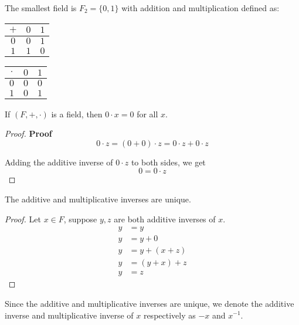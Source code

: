 \begin{remark}
The smallest field is $F_2 = \{ 0, 1 \}$ with addition and multiplication defined as: \\
\begin{center}
    \begin{tabular}{c | c | c}
        $+$ & $0$ & $1$ \\
        \hline
        $0$ & $0$ & $1$ \\
        $1$ & $1$ & $0$ \\
    \end{tabular}
\end{center}
\begin{center}
    \begin{tabular}{c | c | c}
        $\cdot$ & $0$ & $1$ \\
        \hline
        $0$ & $0$ & $0$ \\
        $1$ & $0$ & $1$ \\
    \end{tabular}
\end{center}
\end{remark}

\begin{remark}
If $(F, +, \cdot)$ is a field, then $0 \cdot x = 0$ for all $x$.  
\end{remark}

\begin{proof}
\textbf{Proof}
\[
0 \cdot z = (0 + 0) \cdot z = 0 \cdot z + 0 \cdot z
\]

Adding the additive inverse of $0 \cdot z$ to both sides, we get
\[
0 = 0 \cdot z
\]
\end{proof}

\begin{remark}
The additive and multiplicative inverses are unique.
\end{remark}

\begin{proof}
Let $x \in F$, suppose $y, z$ are both additive inverses of $x$.
\begin{align*}
    y &= y \\
    y &= y + 0 \\
    y &= y + (x + z) \\
    y &= (y + x) + z \\
    y &= z
\end{align*}
\end{proof}

\begin{remark}
Since the additive and multiplicative inverses are unique, we denote the additive inverse and multiplicative inverse of $x$ respectively as $-x$ and $x^{-1}$.
\end{remark}

